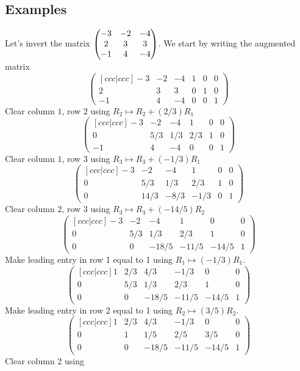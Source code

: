 \documentclass{article}
\begin{document}
\subsection{Examples}


\begin{Example}
Let's invert the matrix \(\begin{pmatrix} -3 & -2 & -4 \\ 2 & 3 & 3 \\ -1 & 4 &
-4\end{pmatrix}\). We start by writing the augmented matrix \[\begin{pmatrix}[
c c c | c c c ] -3 & -2 & -4 & 1 & 0 & 0 \\ 2 & 3 & 3 & 0 & 1 & 0
\\ -1 & 4 & -4 & 0 & 0 & 1 \end{pmatrix}\] Clear column \(1\), row
\(2\) using \(R_2\mapsto R_2+(2/3)R_1\)\[\begin{pmatrix}[ c c c | c
c c ] -3 & -2 & -4 & 1 & 0 & 0 \\ 0 & 5/3 & 1/3 & 2/3 & 1 & 0 \\ -1
& 4 & -4 & 0 & 0 & 1 \end{pmatrix}\] Clear column \(1\), row \(3\)
using \(R_3\mapsto R_3+(-1/3)R_1\) \[\begin{pmatrix}[ c c c | c c c
] -3 & -2 & -4 & 1 & 0 & 0 \\ 0 & 5/3 & 1/3 & 2/3 & 1 & 0 \\ 0 &
14/3 & -8/3 & -1/3 & 0 & 1 \end{pmatrix}\] Clear column \(2\), row
\(3\) using \(R_3\mapsto R_3+(-14/5)R_2\) \[\begin{pmatrix}[ c c c |
c c c ] -3 & -2 & -4 & 1 & 0 & 0 \\ 0 & 5/3 & 1/3 & 2/3 & 1 & 0 \\ 0
& 0 & -18/5 & -11/5 & -14/5 & 1 \end{pmatrix}\] Make leading entry
in row 1 equal to 1 using \(R_1\mapsto
(-1/3)R_1\). \[\begin{pmatrix}[ c c c | c c c ] 1 & 2/3 & 4/3 & -1/3
& 0 & 0 \\ 0 & 5/3 & 1/3 & 2/3 & 1 & 0 \\ 0 & 0 & -18/5 & -11/5 &
-14/5 & 1 \end{pmatrix}\] Make leading entry in row 2 equal to 1
using \(R_2\mapsto (3/5)R_2\). \[\begin{pmatrix}[ c c c | c c c ] 1
& 2/3 & 4/3 & -1/3 & 0 & 0 \\ 0 & 1 & 1/5 & 2/5 & 3/5 & 0 \\ 0 & 0 &
-18/5 & -11/5 & -14/5 & 1 \end{pmatrix}\] Clear column 2 using

\end{Example}
\end{document}
